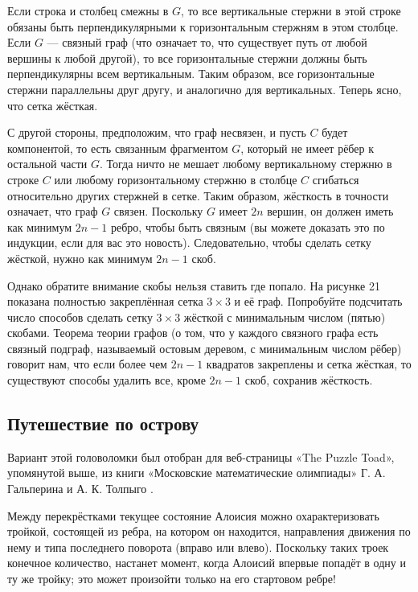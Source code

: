 Если строка и столбец смежны в $G$, то все вертикальные стержни в этой строке обязаны быть перпендикулярными к горизонтальным стержням в этом столбце.
Если $G$ --- связный граф (что означает то, что существует путь от любой вершины к любой другой), то все горизонтальные стержни должны быть перпендикулярны всем вертикальным.
Таким образом, все горизонтальные стержни параллельны друг другу, и аналогично для вертикальных.
Теперь ясно, что сетка жёсткая.

С другой стороны, предположим, что граф несвязен, и пусть $C$ будет компонентой, то есть связанным фрагментом $G$, который не имеет рёбер к остальной части $G$.
Тогда ничто не мешает любому вертикальному стержню в строке $C$ или любому горизонтальному стержню в столбце $C$ сгибаться относительно других стержней в сетке.
Таким образом, жёсткость в точности означает, что граф $G$ связен.
Поскольку $G$ имеет $2n$ вершин, он должен иметь как минимум $2n - 1$ ребро, чтобы быть связным (вы можете доказать это по индукции, если для вас это новость).
Следовательно, чтобы сделать сетку жёсткой, нужно как минимум $2n - 1$ скоб.

Однако обратите внимание скобы нельзя ставить где попало.
На рисунке 21 показана полностью закреплённая сетка $3 \times 3$ и её граф.
Попробуйте подсчитать число способов сделать сетку $3 \times 3$ жёсткой с минимальным числом (пятью) скобами.
Теорема теории графов (о том, что у каждого связного графа есть связный подграф, называемый остовым деревом, с минимальным числом рёбер) говорит нам, что если более чем $2n - 1$ квадратов закреплены и сетка жёсткая, то существуют способы удалить все, кроме $2n - 1$ скоб, сохранив жёсткость.

\subsection*{Путешествие по острову}

Вариант этой головоломки был отобран для веб-страницы «The Puzzle Toad», упомянутой выше, из книги «Московские математические олимпиады» Г. А. Гальперина и А. К. Толпыго \cite{galperin-tolpygo}.

Между перекрёстками текущее состояние Алоисия можно охарактеризовать тройкой, состоящей из ребра, на котором он находится, направления движения по нему и типа последнего поворота (вправо или влево).
Поскольку таких троек конечное количество, настанет момент, когда Алоисий впервые попадёт в одну и ту же тройку; это может произойти только на его стартовом ребре!

